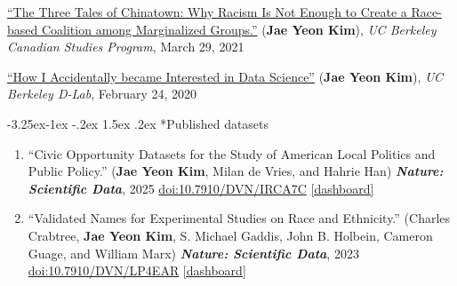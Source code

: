 \documentclass[10pt, letterpaper]{article}
\makeatletter
\renewcommand\subsection{\@startsection{subsection}{2}{\z@}%
  {-3.25ex\@plus -1ex \@minus -.2ex}%
  {1.5ex \@plus .2ex}%
  {\normalfont\large\bfseries\color{cvnavy}}}
\makeatother
\begin{document}
\begin{etaremune}
    \item \href{https://canada.berkeley.edu/three-tales-chinatown-why-racism-not-enough-create-race-based-coalition-among-marginalized-groups}{``The Three Tales of Chinatown: Why Racism Is Not Enough to Create a Race-based Coalition among Marginalized Groups.''} (\textbf{Jae Yeon Kim}), \textit{UC Berkeley Canadian Studies Program}, March 29, 2021
    \item 
    \href{https://dlab.berkeley.edu/news/how-i-accidentally-became-interested-data-science}{``How I Accidentally became Interested in Data Science''} (\textbf{Jae Yeon Kim}), \textit{UC Berkeley D-Lab}, February 24, 2020
\end{etaremune}

\subsection*{Published datasets}

\begin{enumerate}
  \item ``Civic Opportunity Datasets for the Study of American Local Politics and Public Policy.'' (\textbf{Jae Yeon Kim}, Milan de Vries, and Hahrie Han) \textbf{\textit{Nature: Scientific Data}}, 2025 \href{https://doi.org/10.7910/DVN/IRCA7C}{doi:10.7910/DVN/IRCA7C} \href{https://snfagora.github.io/agora_dashboard/?fbclid=IwY2xjawLaOfVleHRuA2FlbQIxMABicmlkETFjN0hpbTRmazRGM0FYVmdaAR6ipZf2atKm8y3rkaz7pwGfldXbCz7spdjecvdG2-BN0S7EApa2LNc_vJU-qQ_aem_f1h1LN8V-5OmYqn207OZsw}{[dashboard]}
  
  \item ``Validated Names for Experimental Studies on Race and Ethnicity.'' (Charles Crabtree, \textbf{Jae Yeon Kim}, S. Michael Gaddis, John B. Holbein, Cameron Guage, and William Marx) \textbf{\textit{Nature: Scientific Data}}, 2023  \href{https://doi.org/10.7910/DVN/LP4EAR}{doi:10.7910/DVN/LP4EAR} \href{https://jaeyk.github.io/select_validated_names/?fbclid=IwY2xjawP0TOlleHRuA2FlbQIxMABicmlkETFIdVoxek4zU0p0SFhzZXZJc3J0YwZhcHBfaWQQMjIyMDM5MTc4ODIwMDg5MgABHm5a4tquUfrPydahJ1v3TX_HaLK7plqgT8aORGfWqVaYnyGDFhm4VdK0zE_h_aem_KusnJygN3w44M1hksHeycw}{[dashboard]}
\end{enumerate}
\end{document}
